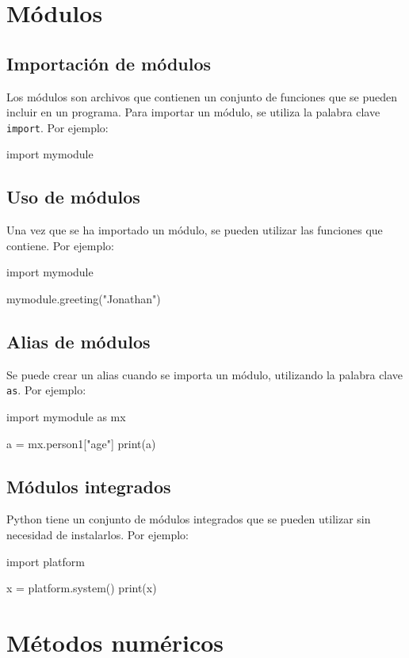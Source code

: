 \documentclass{article}
\begin{document}
\section{Módulos}
\subsection{Importación de módulos}
Los módulos son archivos que contienen un conjunto de funciones que se pueden incluir en un programa. Para importar un módulo, se utiliza la palabra clave \texttt{import}. Por ejemplo:
\begin{python_code}
import mymodule
\end{python_code}
\subsection{Uso de módulos}
Una vez que se ha importado un módulo, se pueden utilizar las funciones que contiene. Por ejemplo:
\begin{python_code}
import mymodule

mymodule.greeting("Jonathan")
\end{python_code}
\subsection{Alias de módulos}
Se puede crear un alias cuando se importa un módulo, utilizando la palabra clave \texttt{as}. Por ejemplo:
\begin{python_code}
import mymodule as mx

a = mx.person1["age"]
print(a)
\end{python_code}
\subsection{Módulos integrados}
Python tiene un conjunto de módulos integrados que se pueden utilizar sin necesidad de instalarlos. Por ejemplo:
\begin{python_code}
import platform

x = platform.system()
print(x)
\end{python_code}

\section{Métodos numéricos}
\end{document}
